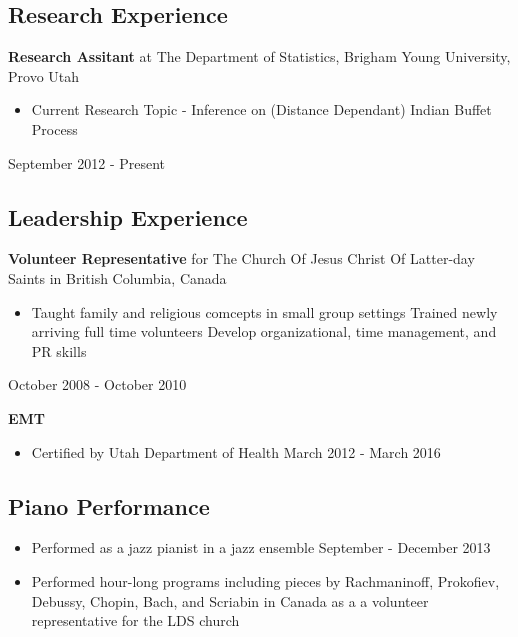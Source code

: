 \documentclass{article}
\begin{document}
  \subsection*{Research Experience}
    \textbf{\indent Research Assitant} at
    The Department of Statistics, Brigham Young University, Provo Utah
    \begin{adjustwidth}{2.5em}{0pt}
      \begin{itemize}
        \item Current Research Topic - Inference on (Distance Dependant) 
                                       Indian Buffet Process 
      \end{itemize}
    \hfill September 2012 - Present
    \end{adjustwidth}

  \subsection*{Leadership Experience}
    \begin{adjustwidth}{1.5em}{0pt}
    \textbf{Volunteer Representative} for The Church Of Jesus Christ Of 
                                      Latter-day Saints in 
                                      British Columbia, Canada 
    \end{adjustwidth}
    \begin{adjustwidth}{2.5em}{0pt}
      \begin{itemize}
        \item Taught family and religious comcepts in small group settings
              Trained newly arriving full time volunteers
              Develop organizational, time management, and PR skills
      \end{itemize}
    \hfill October 2008 - October 2010
    \end{adjustwidth}  

    \begin{adjustwidth}{1.5em}{0pt}
    \textbf{EMT}
    \end{adjustwidth}                                  
    \begin{adjustwidth}{2.5em}{0pt}
      \begin{itemize}
        \item Certified by Utah Department of Health \hfill March 2012 - March 2016
      \end{itemize}
    \end{adjustwidth}  

    \subsection*{Piano Performance}
      \begin{itemize}
        \item Performed as a jazz pianist in a jazz ensemble 
        \hfill September - December 2013
        \item Performed hour-long programs including pieces by Rachmaninoff, 
              Prokofiev, Debussy, Chopin, Bach, and Scriabin in Canada as a
              a volunteer representative for the LDS church
      \end{itemize}
\end{document}
